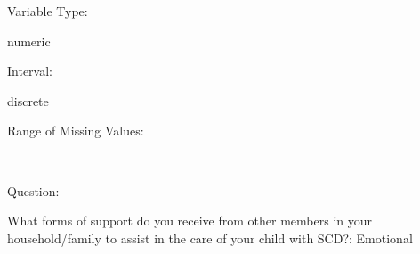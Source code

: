 \documentclass[
]{article}
\begin{document}
\begin{minipage}[t]{0.3\linewidth}

Variable Type:

\end{minipage}%
\begin{minipage}[t]{0.7\linewidth}

numeric

\end{minipage}

\begin{minipage}[t]{0.3\linewidth}

Interval:

\end{minipage}%
\begin{minipage}[t]{0.7\linewidth}

discrete

\end{minipage}

\begin{minipage}[t]{0.3\linewidth}

Range of Missing Values:

\end{minipage}%
\begin{minipage}[t]{0.7\linewidth}

~

\end{minipage}

\begin{minipage}[t]{0.3\linewidth}

Question:

\end{minipage}%
\begin{minipage}[t]{0.7\linewidth}

What forms of support do you receive from other members in your
household/family to assist in the care of your child with SCD?:
Emotional

\end{minipage}
\end{document}
